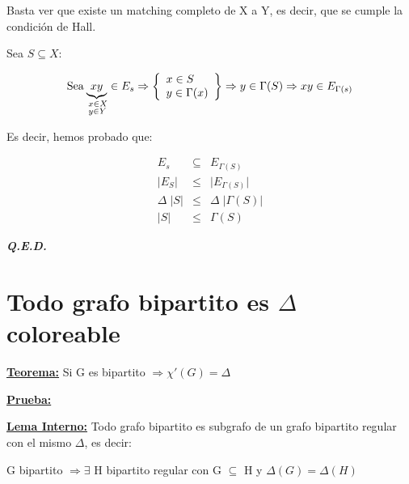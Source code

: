 \documentclass[12pt,a4paper]{report}
\newcommand{\QED}{\hfill \textit{\textbf{Q.E.D.}}}
\begin{document}
			\vspace{3mm}
			\par Basta ver que existe un matching completo de X a Y, es decir, que se cumple la condición de Hall.

			\vspace{5mm}
			\par Sea $S \subseteq X$:

			\begin{equation*}
				\text{Sea}
				\underbrace{xy}_{\begin{subarray}{l} \; x \in X \\
				\; y \in Y \end{subarray}} \in E_{s} \Rightarrow
	  			\left\lbrace
	  			\begin{array}{l}
	    			x \in S \\
	     		  	y \in \Gamma(x) \\
	  			\end{array}
	 			\right\rbrace
	 			\Rightarrow y \in \Gamma(S) \Rightarrow xy \in E_{\Gamma(s)}
			\end{equation*}

			\vspace{3mm}
			\par Es decir, hemos probado que:

			\begin{eqnarray}
				\nonumber E_{s} &\subseteq & E_{\Gamma(S)} \\
				\nonumber \lvert E_{S} \rvert &\leq & \lvert E_{\Gamma(S)} \rvert \\
				\nonumber \Delta \; \lvert S \rvert &\leq & \Delta \; \lvert \Gamma(S) \rvert \\
				\nonumber \lvert S \rvert &\leq & \Gamma(S)
			\end{eqnarray}

		\QED

	\section{Todo grafo bipartito es $\Delta$ coloreable}
		\textbf{\underline{Teorema:}} Si G es bipartito $\Rightarrow \chi '(G) = \Delta $

		\textbf{\underline{Prueba:}}

			\vspace{3mm}
			\underline{\textbf{Lema Interno:}} Todo grafo bipartito es subgrafo de un grafo bipartito regular con el mismo $\Delta$, es decir:
				\begin{center}
					G bipartito $\Rightarrow \exists$ H bipartito regular con G $\subseteq$ H y $\Delta(G) = \Delta(H)$
				\end{center}
\end{document}
